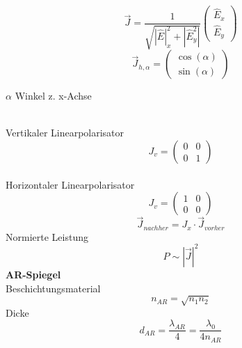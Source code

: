 \documentclass[12pt,a4paper,oneside]{article}
\begin{document}
\begin{multicols}{2}
$$\vec{J}=\frac{1}{\sqrt{|\hat{E}|^2_x+|\hat{E}^2_y|}} \begin{pmatrix}
\hat{E}_x \\ \hat{E}_y
\end{pmatrix}$$
$$\vec{J}_{h, \alpha}  = \begin{pmatrix}
\cos(\alpha) \\ \sin(\alpha)
\end{pmatrix} $$ 
\begin{tiny} $\alpha$ Winkel z. x-Achse
\end{tiny}
\\Vertikaler Linearpolarisator $$ J_v = \begin{pmatrix}
0  & 0 \\ 0 & 1
\end{pmatrix}$$
\\Horizontaler Linearpolarisator $$ J_v = \begin{pmatrix}
1  & 0 \\ 0 & 0
\end{pmatrix}$$
$$\vec{J}_{nachher}= J_x \cdot \vec{J}_{vorher}$$
Normierte Leistung $$ P \sim |\vec{J}|^2$$
\textbf{AR-Spiegel}\\
Beschichtungsmaterial
$$n_{AR}= \sqrt{n_1 n_2} $$
Dicke $$d_{AR}= \frac{\lambda_{AR}}{4}= \frac{\lambda_0}{4 n_{AR}}$$
\end{multicols}
\end{document}
